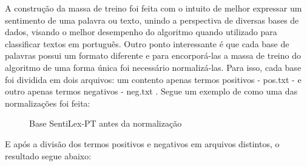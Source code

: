 A construção da massa de treino foi feita com o intuito de melhor expressar um sentimento de uma palavra ou texto, unindo a perspectiva de diversas bases de dados, visando o melhor desempenho do algoritmo quando utilizado para classificar textos em português. Outro ponto interessante é que cada base de palavras possui um formato diferente e para encorporá-las a massa de treino do algoritmo de uma forma única foi necessário normalizá-las. Para isso, cada base foi dividida em dois arquivos: um contento apenas termos positivos - pos.txt - e outro apenas termos negativos - neg.txt . Segue um exemplo de como uma das normalizações foi feita:


\begin{figure}[H]
	\centering{}
	\caption{Base SentiLex-PT antes da normalização}
	\label{sentilex}
\end{figure}

E após a divisão dos termos positivos e negativos em arquivos distintos, o resultado segue abaixo:


